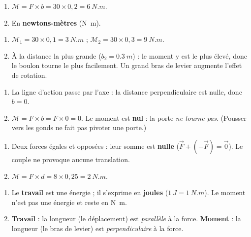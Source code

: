 \documentclass[11pt,a4paper]{article}
\newcommand{\vv}[1]{\vec{#1}}\newcommand{\ds}{\displaystyle}
\begin{document}
\begin{corrige}
\begin{enumerate}[label=\alph*)]
  \item $\mathcal{M} = F\times b = 30\times 0{,}2 = \qty{6}{N.m}$.
  \item En \textbf{newtons-mètres} (\si{\newton\metre}).
\end{enumerate}
\end{corrige}

\begin{corrige}
\begin{enumerate}[label=\alph*)]
  \item $\mathcal{M}_1 = 30\times 0{,}1 = \qty{3}{N.m}$ ; $\mathcal{M}_2 = 30\times 0{,}3 = \qty{9}{N.m}$.
  \item À la distance la plus grande ($b_2=\qty{0.3}{m}$) : le moment y est le plus élevé, donc le
        boulon tourne le plus facilement. Un grand bras de levier augmente l'effet de rotation.
\end{enumerate}
\end{corrige}

\begin{corrige}
\begin{enumerate}[label=\alph*)]
  \item La ligne d'action passe par l'axe : la distance perpendiculaire est nulle, donc $b=0$.
  \item $\mathcal{M} = F\times b = F\times 0 = 0$. Le moment est \textbf{nul} : la porte \emph{ne tourne
        pas}. (Pousser vers les gonds ne fait pas pivoter une porte.)
\end{enumerate}
\end{corrige}

\begin{corrige}
\begin{enumerate}[label=\alph*)]
  \item Deux forces égales et opposées : leur somme est \textbf{nulle} ($\vv F+(-\vv F)=\vv 0$). Le
        couple ne provoque aucune translation.
  \item $\mathcal{M} = F\times d = 8\times 0{,}25 = \qty{2}{N.m}$.
\end{enumerate}
\end{corrige}

\begin{corrige}
\begin{enumerate}[label=\alph*)]
  \item Le \textbf{travail} est une énergie ; il s'exprime en \textbf{joules}
        ($\qty{1}{J}=\qty{1}{N.m}$). Le moment n'est pas une énergie et reste en \si{\newton\metre}.
  \item \textbf{Travail} : la longueur (le déplacement) est \emph{parallèle} à la force.
        \textbf{Moment} : la longueur (le bras de levier) est \emph{perpendiculaire} à la force.
\end{enumerate}
\end{corrige}
\end{document}
